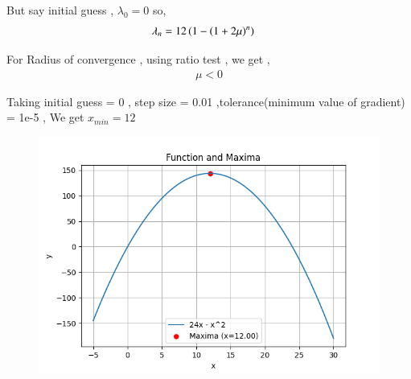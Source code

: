 \documentclass[journal]{IEEEtran}
\begin{document}
But say initial guess , $\lambda_0 = 0 $ so,
\begin{align}
\lambda_n &=  12\left(1 - \left(1+2\mu\right)^n\right)
\end{align}

For Radius of convergence , using ratio test , we get ,
\begin{align}
\mu < 0 
\end{align}

Taking initial guess = 0 , step size = 0.01 ,tolerance(minimum value of gradient) = 1e-5 , We get 
$x_{min} = 12$\\

\begin{figure}[h!]
   \centering
   \includegraphics[width=0.7\linewidth]{figs/Figure_1.png}
\end{figure}
\end{document}
